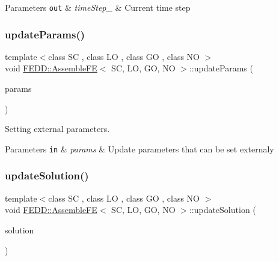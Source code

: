 \begin{DoxyParams}[1]{Parameters}
\mbox{\tt out}  & {\em time\+Step\+\_\+} & Current time step \\
\hline
\end{DoxyParams}
\mbox{\label{classFEDD_1_1AssembleFE_a48ea6d9259f538a88fa5b21667869bce}} 
\subsubsection{\texorpdfstring{update\+Params()}{updateParams()}}
{\footnotesize\ttfamily template$<$class SC , class LO , class GO , class NO $>$ \\
void \hyperlink{classFEDD_1_1AssembleFE}{F\+E\+D\+D\+::\+Assemble\+FE}$<$ SC, LO, GO, NO $>$\+::update\+Params (\begin{DoxyParamCaption}\item[{Parameter\+List\+Ptr\+\_\+\+Type}]{params }\end{DoxyParamCaption})}



Setting external parameters. 


\begin{DoxyParams}[1]{Parameters}
\mbox{\tt in}  & {\em params} & Update parameters that can be set externaly \\
\hline
\end{DoxyParams}
\mbox{\label{classFEDD_1_1AssembleFE_a5303adf0752fe27d9ff47ae8a39c1da4}} 
\subsubsection{\texorpdfstring{update\+Solution()}{updateSolution()}}
{\footnotesize\ttfamily template$<$class SC , class LO , class GO , class NO $>$ \\
void \hyperlink{classFEDD_1_1AssembleFE}{F\+E\+D\+D\+::\+Assemble\+FE}$<$ SC, LO, GO, NO $>$\+::update\+Solution (\begin{DoxyParamCaption}\item[{vec\+\_\+dbl\+\_\+\+Type}]{solution }\end{DoxyParamCaption})}



